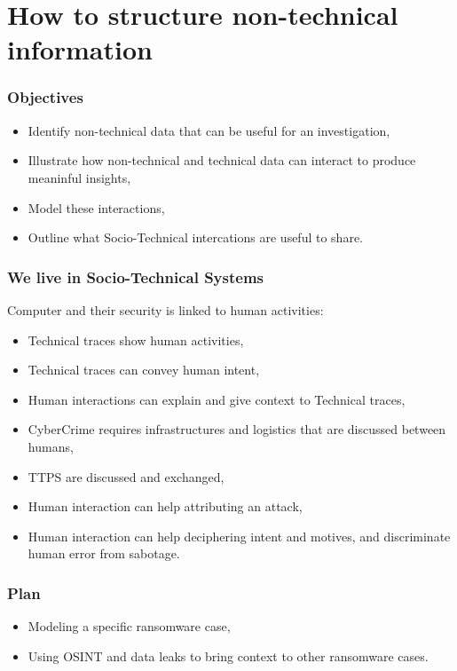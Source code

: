 \section{How to structure non-technical information}
\begin{frame}
    \frametitle{Objectives}
    \begin{itemize}
        \item Identify non-technical data that can be useful for an investigation,
        \item Illustrate how non-technical and technical data can interact to produce meaninful insights,
        \item Model these interactions,
        \item Outline what Socio-Technical intercations are useful to share.
    \end{itemize}

\end{frame}


\begin{frame}
    \frametitle{We live in Socio-Technical Systems}
    Computer and their security is linked to human activities:

    \begin{itemize}
        \item Technical traces show human activities,
        \item Technical traces can convey human intent,
        \item Human interactions can explain and give context to Technical traces,
        \item CyberCrime requires infrastructures and logistics that are discussed between humans,
        \item TTPS are discussed and exchanged,
        \item Human interaction can help attributing an attack,
        \item Human interaction can help deciphering intent and motives, and discriminate human error from sabotage.
    \end{itemize}
\end{frame}


\begin{frame}
    \frametitle{Plan}
    \begin{itemize}
        \item Modeling a specific ransomware case,
        \item Using OSINT and data leaks to bring context to other ransomware cases.
    \end{itemize}

\end{frame}

